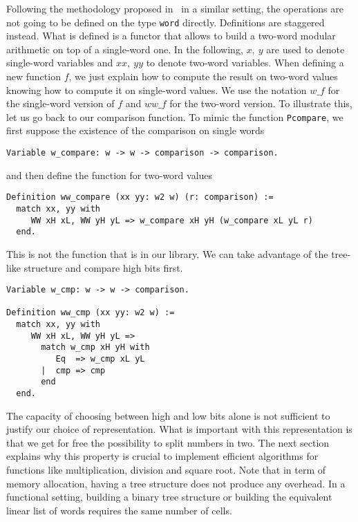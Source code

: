 Following the methodology proposed in~\cite{GreMa} in a similar setting, 
the operations are not going to be defined on the type {\tt word} directly.
Definitions are staggered instead. What is defined is a functor that 
allows to build a two-word modular arithmetic on top of a single-word one.
In the following, $x,\ y$ are used to denote single-word variables and $xx,\ yy$ 
to denote two-word variables. 
When defining a new function $f$, we just explain how to compute the 
result on two-word values knowing how to compute it on single-word values.
We use the notation $w\_f$ for the single-word version of $f$ and 
$ww\_f$ for the two-word version.
To illustrate this, let us go back to our comparison function. 
To mimic the function {\tt Pcompare}, we first suppose the existence
of the comparison on single words
\begin{verbatim}
Variable w_compare: w -> w -> comparison -> comparison.
\end{verbatim}
and then define the function for two-word values
\begin{verbatim}
Definition ww_compare (xx yy: w2 w) (r: comparison) :=
  match xx, yy with
     WW xH xL, WW yH yL => w_compare xH yH (w_compare xL yL r) 
  end.
\end{verbatim}
This is not the function that is in our library. We can take 
advantage of the tree-like structure and compare high bits first.  
\begin{verbatim}
Variable w_cmp: w -> w -> comparison.

Definition ww_cmp (xx yy: w2 w) :=
  match xx, yy with
     WW xH xL, WW yH yL => 
       match w_cmp xH yH with 
          Eq  => w_cmp xL yL
       |  cmp => cmp
       end
  end. 
\end{verbatim}
The capacity of choosing between high and low bits alone is
not sufficient to justify our choice of representation. What
is important with this representation is that we get for free
the possibility to split numbers in two. The next section 
explains why this property is crucial to implement efficient
algorithms for functions like multiplication, division and square root.
Note that in term of memory allocation, having a tree structure
does not produce any overhead. In a functional setting, building a binary 
tree structure or building the equivalent linear list of words requires the same number of cells.

